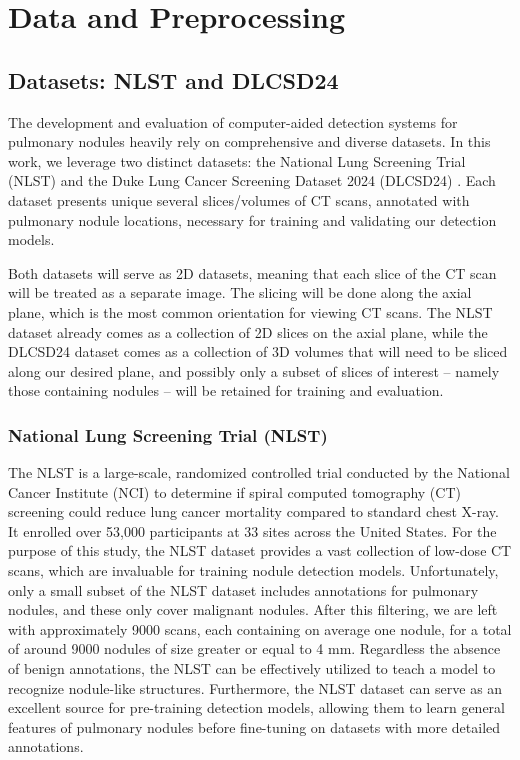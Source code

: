 \chapter{Data and Preprocessing}
\label{chap:data-and-preprocessing}
\section{Datasets: NLST and DLCSD24}
The development and evaluation of computer-aided detection systems for pulmonary nodules heavily rely on comprehensive and diverse datasets. In this work, we leverage two distinct datasets: the National Lung Screening Trial (NLST) \cite{nlst_data} and the Duke Lung Cancer Screening Dataset 2024 (DLCSD24) \cite{dlcsd24}. Each dataset presents unique several slices/volumes of CT scans, annotated with pulmonary nodule locations, necessary for training and validating our detection models.

Both datasets will serve as 2D datasets, meaning that each slice of the CT scan will be treated as a separate image. The slicing will be done along the axial plane, which is the most common orientation for viewing CT scans.
The NLST dataset already comes as a collection of 2D slices on the axial plane, while the DLCSD24 dataset comes as a collection of 3D volumes that will need to be sliced along our desired plane, and possibly only a subset of slices of interest -- namely those containing nodules -- will be retained for training and evaluation.

\subsection{National Lung Screening Trial (NLST)}
The NLST is a large-scale, randomized controlled trial conducted by the National Cancer Institute (NCI) to determine if spiral computed tomography (CT) screening could reduce lung cancer mortality compared to standard chest X-ray. It enrolled over 53,000 participants at 33 sites across the United States. For the purpose of this study, the NLST dataset provides a vast collection of low-dose CT scans, which are invaluable for training nodule detection models.
Unfortunately, only a small subset of the NLST dataset includes annotations for pulmonary nodules, and these only cover malignant nodules.
After this filtering, we are left with approximately 9000 scans, each containing on average one nodule, for a total of around 9000 nodules of size greater or equal to 4 mm.
Regardless the absence of benign annotations, the NLST can be effectively utilized to teach a model to recognize nodule-like structures. Furthermore, the NLST dataset can serve as an excellent source for pre-training detection models, allowing them to learn general features of pulmonary nodules before fine-tuning on datasets with more detailed annotations.


